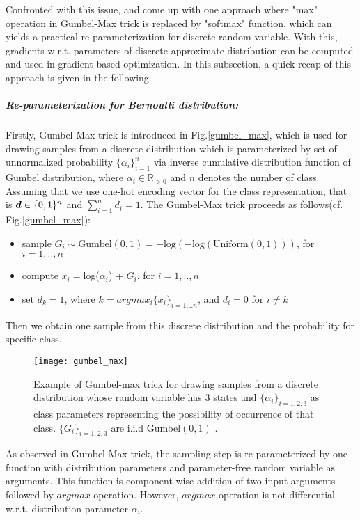 Confronted with this issue, \cite{jang2016categorical} and \cite{maddison2016concrete} come up with one approach where "max" operation in Gumbel-Max trick is replaced by "softmax" function, which can yields a practical re-parameterization for discrete random variable. With this, gradients w.r.t. parameters of discrete approximate distribution can be computed and used in gradient-based optimization. In this subsection, a quick recap of this approach is given in the following.

\subparagraph{Re-parameterization for Bernoulli distribution:}
Firstly, Gumbel-Max trick\cite{maddison2014sampling} is introduced in Fig.\ref{gumbel_max}, which is used for drawing samples from a discrete distribution which is parameterized by set of unnormalized probability $\{\alpha_i\}_{i=1}^{n}$ via inverse cumulative distribution function of Gumbel distribution, where $\alpha_i \in \mathbb R_{>0}$ and $n$ denotes the number of class. Assuming that we use one-hot encoding vector for the class representation, that is $\boldsymbol d \in \{0,1\}^n $ and $\sum_{i=1}^{n}d_i = 1$. The Gumbel-Max trick proceeds as follows(cf. Fig.\ref{gumbel_max}):
\begin{itemize}
	\item sample $G_i \sim \text{Gumbel}(0,1) = -\text{log}(-\text{log}(\text{Uniform}(0,1)))$, for $i=1,..,n$
	\item compute $x_i = $log($\alpha_i$) + $G_i$, for $i=1,..,n$
	\item set $d_k = 1$, where $k=argmax_i\{x_i\}_{i=1,..n}$, and $d_i = 0$ for $i \neq k$
\end{itemize}
Then we obtain one sample from this discrete distribution and the probability for specific class.

\begin{figure}[h!]
	\begin{center} \label{gumbel_max}
		\texttt{[image: gumbel\_max]}
		\caption{Example of Gumbel-max trick for drawing samples from a discrete distribution whose random variable has 3 states and $\{\alpha_{i}\}_{i=1,2,3}$ as class parameters representing the possibility of occurrence of that class. $\{G_{i}\}_{i=1,2,3}$ are i.i.d Gumbel$(0,1)$ \cite{maddison2016concrete}.}		
		\label{fig:gumbel_max}
	\end{center}
\end{figure}

As observed in Gumbel-Max trick, the sampling step is re-parameterized by one function with distribution parameters and parameter-free random variable as arguments. This function is component-wise addition of two input arguments followed by $argmax$ operation. However, $argmax$ operation is not differential w.r.t. distribution parameter $\alpha_i$. 

